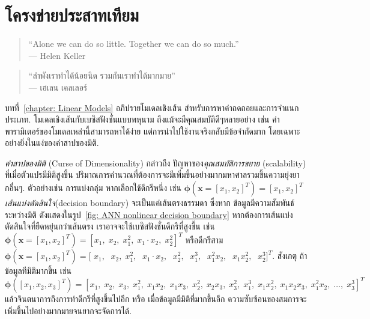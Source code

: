 \chapter{โครงข่ายประสาทเทียม}
\label{chapter: ANN}

\begin{verse}
``Alone we can do so little. Together we can do so much.''\\
--- Helen Keller
\end{verse}

\begin{verse}
``ลำพังเราทำได้น้อยนิด รวมกันเราทำได้มากมาย''\\
--- เฮเลน เคลเลอร์
\end{verse}


บทที่~\ref{chapter: Linear Models} อภิปรายโมเดลเชิงเส้น สำหรับการหาค่าถดถอยและการจำแนกประเภท. โมเดลเชิงเส้นกับเบซิสฟังชั่นแบบพหุนาม ถึงแม้จะมีคุณสมบัติดีๆหลายอย่าง เช่น 
ค่าพารามิเตอร์ของโมเดลเหล่านี้สามารถหาได้ง่าย 
แต่การนำไปใช้งานจริงกลับมีข้อจำกัดมาก โดยเฉพาะอย่างยิ่งในแง่ของคำสาปของมิติ.

{\small
\begin{shaded}
\textit{คำสาปของมิติ} (Curse of Dimensionality)
กล่าวถึง ปัญหาของ\textit{คุณสมบัติการขยาย} (scalability) ที่เมื่อตัวแปรมีมิติสูงขึ้น ปริมาณการคำนวณที่ต้องการจะมีเพิ่มขึ้นอย่างมากมหาศาลรวมขึ้นความยุ่งยากอื่นๆ.
ตัวอย่างเช่น การแบ่งกลุ่ม หากเลือกใช้ดีกรีหนึ่ง
เช่น 
$\bm{\phi}(\mathbf{x} = [x_1, x_2]^T) = [x_1, x_2]^T$
\textit{เส้นแบ่งตัดสินใจ}(decision boundary) จะเป็นแค่เส้นตรงธรรมดา
ซึ่งหาก ข้อมูลมีความสัมพันธ์ระหว่างมิติ ดังแสดงในรูป~\ref{fig: ANN nonlinear decision boundary}
หากต้องการเส้นแบ่งตัดสินใจที่ยืดหยุ่นกว่าเส้นตรง เราอาจจะใช้เบซิสฟังชั่นดีกรีที่สูงขึ้น เช่น
$\bm{\phi}(\mathbf{x} = [x_1, x_2]^T) = [x_1,\; x_2,\; x_1^2,\; x_1 \cdot x_2,\; x_2^2]^T$
หรือดีกรีสาม $\bm{\phi}(\mathbf{x} = [x_1, x_2]^T) = [$ $x_1,\;$ $x_2,\; x_1^2,\;$ $x_1 \cdot x_2,\;$ $x_2^2,\;$ $x_1^3,\;$ $x_1^2 x_2,\;$ $x_1 x_2^2,\;$ $x_2^3]^T$.
สังเกตุ ถ้าข้อมูลทีมิติมากขึ้น เช่น $\bm{\phi}([x_1, x_2, x_3]^T) = [x_1,\; x_2,\; x_3,\; x_1^2,\; x_1 x_2,\; x_1 x_3,\; x_2^2,\; x_2 x_3,\; x_3^2,\; x_1^3,\; x_1 x_2^2,\; x_1 x_2 x_3,\; x_1^2 x_2,\; \ldots,\; x_3^3]^T$
แล้วจินตนาการถึงการทำดีกรีที่สูงขึ้นไปอีก หรือ เมื่อข้อมูลมีมิติที่มากขึ้นอีก 
ความซับซ้อนของสมการจะเพิ่มขึ้นไปอย่างมากมายจนยากจะจัดการได้.
\end{shaded}
}

